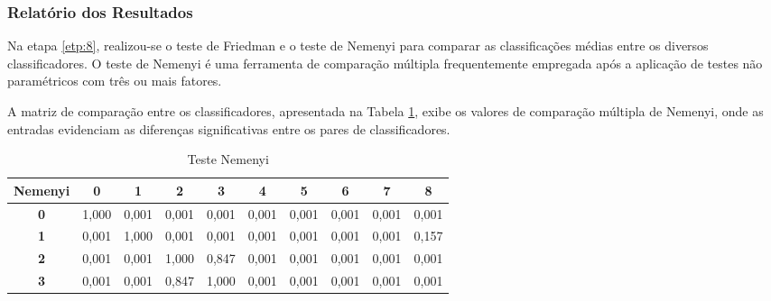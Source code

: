 \subsubsection{Relat\'orio dos Resultados}

Na etapa \ref{etp:8}, realizou-se o teste de Friedman e o teste de Nemenyi para comparar as classificações médias entre os diversos classificadores. O teste de Nemenyi é uma ferramenta de comparação múltipla frequentemente empregada após a aplicação de testes não paramétricos com três ou mais fatores.

A matriz de comparação entre os classificadores, apresentada na Tabela \ref{tb:nemeyi}, exibe os valores de comparação múltipla de Nemenyi, onde as entradas evidenciam as diferenças significativas entre os pares de classificadores.

\begin{table}[!htb]
	\centering
	\caption{Teste Nemenyi}\label{tb:nemeyi}
	\begin{tabular}{@{}clllllllll@{}}
		\toprule
		\multicolumn{1}{l}{\textbf{Nemenyi}} & \multicolumn{1}{c}{\textbf{0}} & \multicolumn{1}{c}{\textbf{1}} & \multicolumn{1}{c}{\textbf{2}} & \multicolumn{1}{c}{\textbf{3}} & \multicolumn{1}{c}{\textbf{4}} & \multicolumn{1}{c}{\textbf{5}} & \multicolumn{1}{c}{\textbf{6}} & \multicolumn{1}{c}{\textbf{7}} & \multicolumn{1}{c}{\textbf{8}} \\ \midrule
		\textbf{0}                           & 1,000                          & 0,001                          & 0,001                          & 0,001                          & 0,001                          & 0,001                          & 0,001                          & 0,001                          & 0,001                          \\
		\textbf{1}                           & 0,001                          & 1,000                          & 0,001                          & 0,001                          & 0,001                          & 0,001                          & 0,001                          & 0,001                          & 0,157                          \\
		\textbf{2}                           & 0,001                          & 0,001                          & 1,000                          & 0,847                          & 0,001                          & 0,001                          & 0,001                          & 0,001                          & 0,001                          \\
		\textbf{3}                           & 0,001                          & 0,001                          & 0,847                          & 1,000                          & 0,001                          & 0,001                          & 0,001                          & 0,001                          & 0,001                          \\

\end{tabular}
\end{table}
